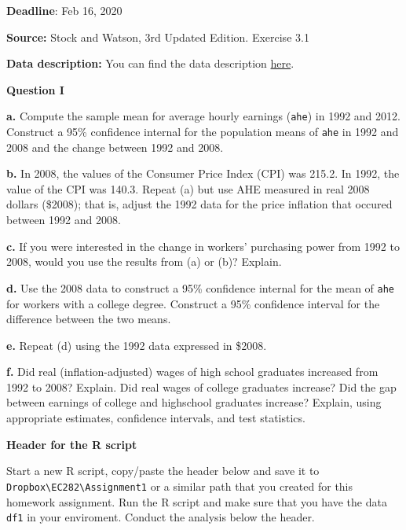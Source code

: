 \documentclass[]{book}
\begin{document}
\textbf{Deadline}: Feb 16, 2020

\textbf{Source:} Stock and Watson, 3rd Updated Edition. Exercise 3.1

\textbf{Data description:} You can find the data description
\href{https://wps.pearsoned.com/wps/media/objects/11422/11696965/empirical/empex_tb/CPS92_08_Description.pdf}{here}.

\textbf{Question I}

\textbf{a.} Compute the sample mean for average hourly earnings
(\texttt{ahe}) in 1992 and 2012. Construct a 95\% confidence internal
for the population means of \texttt{ahe} in 1992 and 2008 and the change
between 1992 and 2008.

\textbf{b.} In 2008, the values of the Consumer Price Index (CPI) was
215.2. In 1992, the value of the CPI was 140.3. Repeat (a) but use AHE
measured in real 2008 dollars (\$2008); that is, adjust the 1992 data
for the price inflation that occured between 1992 and 2008.

\textbf{c.} If you were interested in the change in workers' purchasing
power from 1992 to 2008, would you use the results from (a) or (b)?
Explain.

\textbf{d.} Use the 2008 data to construct a 95\% confidence internal
for the mean of \texttt{ahe} for workers with a college degree.
Construct a 95\% confidence interval for the difference between the two
means.

\textbf{e.} Repeat (d) using the 1992 data expressed in \$2008.

\textbf{f.} Did real (inflation-adjusted) wages of high school graduates
increased from 1992 to 2008? Explain. Did real wages of college
graduates increase? Did the gap between earnings of college and
highschool graduates increase? Explain, using appropriate estimates,
confidence intervals, and test statistics.

\textbf{Header for the R script}

Start a new R script, copy/paste the header below and save it to
\texttt{Dropbox\textbackslash{}EC282\textbackslash{}Assignment1} or a
similar path that you created for this homework assignment. Run the R
script and make sure that you have the data \texttt{df1} in your
enviroment. Conduct the analysis below the header.
\end{document}

